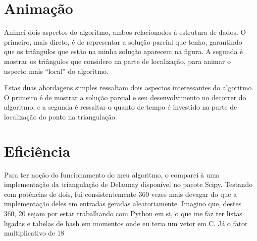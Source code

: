 \documentclass[10pt,reqno,a4paper]{article}
\begin{document}
\section{Animação}

Animei dois aspectos do algoritmo, ambos relacionados à estrutura de dados. O primeiro,
mais direto, é de representar a solução parcial que tenho, garantindo que os triângulos
que estão na minha solução aparecem na figura. A segunda é mostrar os triângulos que
considero na parte de localização, para animar o aspecto mais ``local'' do algoritmo.

Estas duas abordagens simples ressaltam dois aspectos interessantes do algoritmo.
O primeiro é de mostrar a solução parcial e seu desenvolvimento no decorrer do
algoritmo, e a segunda é ressaltar o quanto de tempo é investido na parte de
localização do ponto na triangulação.

\section{Eficiência}

Para ter noção do funcionamento do meu algoritmo, o comparei à uma implementação
da triangulação de Delaunay disponível no pacote Scipy. Testando com potências de
dois, fui consistentemente 360 vezes mais devagar do que a implementação deles em
entradas geradas aleatoriamente. Imagino que, destes 360, 20 sejam por estar
trabalhando com Python em si, o que me faz ter listas ligadas e tabelas de hash
em momentos onde eu teria um vetor em C. Já o fator multiplicativo de 18
\end{document}
